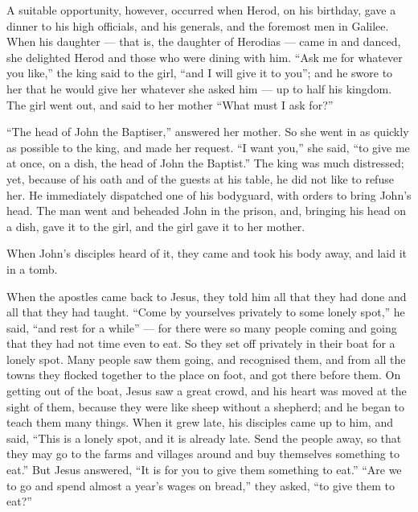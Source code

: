  A suitable opportunity, however, occurred when Herod, on
his birthday, gave a dinner to his high officials, and his generals, and
the foremost men in Galilee.  When his daughter --- that
is, the daughter of Herodias --- came in and danced, she delighted Herod
and those who were dining with him. ``Ask me for whatever you like,''
the king said to the girl, ``and I will give it to you''; 
and he swore to her that he would give her whatever she asked him --- up
to half his kingdom.  The girl went out, and said to her
mother ``What must I ask for?''

``The head of John the Baptiser,'' answered her mother.  So
she went in as quickly as possible to the king, and made her request.
``I want you,'' she said, ``to give me at once, on a dish, the head of
John the Baptist.''  The king was much distressed; yet,
because of his oath and of the guests at his table, he did not like to
refuse her.  He immediately dispatched one of his
bodyguard, with orders to bring John's head. The man went and beheaded
John in the prison,  and, bringing his head on a dish, gave
it to the girl, and the girl gave it to her mother.

 When John's disciples heard of it, they came and took his
body away, and laid it in a tomb.

 When the apostles came back to Jesus, they told him all
that they had done and all that they had taught.  ``Come by
yourselves privately to some lonely spot,'' he said, ``and rest for a
while'' --- for there were so many people coming and going that they had
not time even to eat.  So they set off privately in their
boat for a lonely spot.  Many people saw them going, and
recognised them, and from all the towns they flocked together to the
place on foot, and got there before them.  On getting out
of the boat, Jesus saw a great crowd, and his heart was moved at the
sight of them, because they were like sheep without a shepherd; and he
began to teach them many things.  When it grew late, his
disciples came up to him, and said, ``This is a lonely spot, and it is
already late.  Send the people away, so that they may go to
the farms and villages around and buy themselves something to eat.''
 But Jesus answered, ``It is for you to give them something
to eat.'' ``Are we to go and spend almost a year's wages on bread,''
they asked, ``to give them to eat?''

